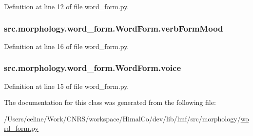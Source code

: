 Definition at line 12 of file word\+\_\+form.\+py.

\hypertarget{classsrc_1_1morphology_1_1word__form_1_1_word_form_a5af5bbdaf2247140e5379dbcf4994ec9}{
\subsubsection[{verb\+Form\+Mood}]{\setlength{\rightskip}{0pt plus 5cm}src.\+morphology.\+word\+\_\+form.\+Word\+Form.\+verb\+Form\+Mood}}\label{classsrc_1_1morphology_1_1word__form_1_1_word_form_a5af5bbdaf2247140e5379dbcf4994ec9}


Definition at line 16 of file word\+\_\+form.\+py.

\hypertarget{classsrc_1_1morphology_1_1word__form_1_1_word_form_ac6fbf70d32545170d2b203a58532706d}{
\subsubsection[{voice}]{\setlength{\rightskip}{0pt plus 5cm}src.\+morphology.\+word\+\_\+form.\+Word\+Form.\+voice}}\label{classsrc_1_1morphology_1_1word__form_1_1_word_form_ac6fbf70d32545170d2b203a58532706d}


Definition at line 15 of file word\+\_\+form.\+py.



The documentation for this class was generated from the following file\+:\begin{DoxyCompactItemize}
\item 
/\+Users/celine/\+Work/\+C\+N\+R\+S/workspace/\+Himal\+Co/dev/lib/lmf/src/morphology/\hyperlink{word__form_8py}{word\+\_\+form.\+py}\end{DoxyCompactItemize}
